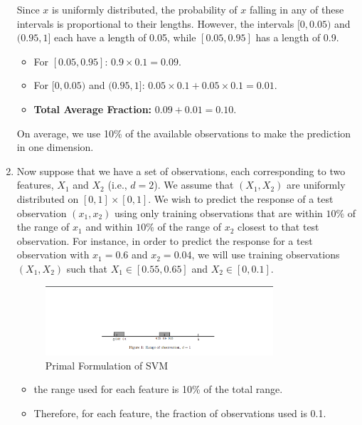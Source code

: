 \documentclass[a3paper,12pt]{extarticle} %
\begin{document}
\begin{enumerate}
 
    Since \(x\) is uniformly distributed, the probability of \(x\) falling in any of these intervals is proportional to their lengths. However, the intervals \([0, 0.05)\) and \((0.95, 1]\) each have a length of 0.05, while \([0.05, 0.95]\) has a length of 0.9.
    
    \begin{itemize}
       
            \item For \([0.05, 0.95]\): \(0.9 \times 0.1 = 0.09\).
            \item For \([0, 0.05)\) and \((0.95, 1]\): \(0.05 \times 0.1 + 0.05 \times 0.1 = 0.01\).
            \item \textbf{Total Average Fraction:} \(0.09 + 0.01 = 0.10\).

    \end{itemize}
    On average, we use 10\% of the available observations to make the prediction in one dimension.
    
    
    \item Now suppose that we have a set of observations, each corresponding to two features, $X_1$ and $X_2$ (i.e., $d = 2$). We assume that $(X_1, X_2)$ are uniformly distributed on $[0, 1] \times [0, 1]$. We wish to predict the response of a test observation $(x_1, x_2)$ using only training observations that are within $10\%$ of the range of $x_1$ and within $10\%$ of the range of $x_2$ closest to that test observation. For instance, in order to predict the response for a test observation with $x_1 = 0.6$ and $x_2 = 0.04$, we will use training observations $(X_1, X_2)$ such that $X_1 \in [0.55, 0.65]$ and $X_2 \in [0, 0.1]$.
    \begin{figure}[h]
        \centering
        \includegraphics[width=0.8\textwidth]{section1.png}
        \caption{Primal Formulation of SVM}
        \label{fig:primal}
    \end{figure}
    \begin{itemize}
    \item  the range used for each feature is 10\% of the total range.
            \item Therefore, for each feature, the fraction of observations used is 0.1.
    

\end{itemize}
\end{enumerate}
\end{document}
